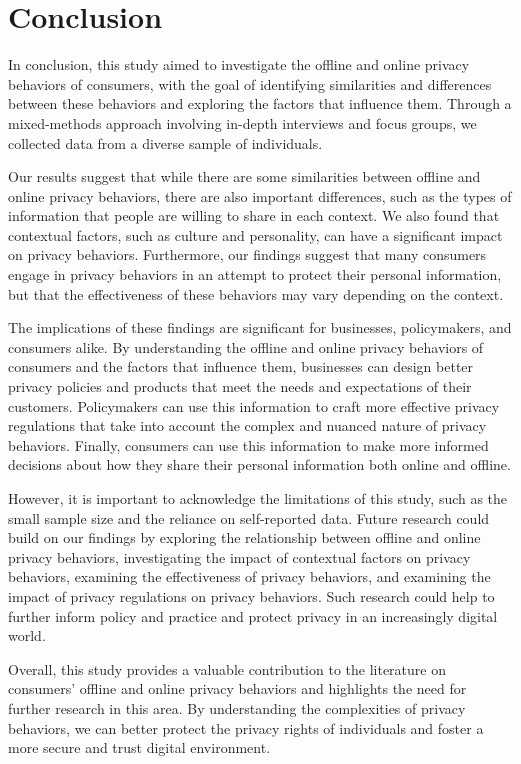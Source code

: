 \section{Conclusion}
\label{conclusion}

In conclusion, this study aimed to investigate the offline and online privacy behaviors of consumers, with the goal of identifying similarities and differences between these behaviors and exploring the factors that influence them. Through a mixed-methods approach involving in-depth interviews and focus groups, we collected data from a diverse sample of individuals.

Our results suggest that while there are some similarities between offline and online privacy behaviors, there are also important differences, such as the types of information that people are willing to share in each context. We also found that contextual factors, such as culture and personality, can have a significant impact on privacy behaviors. Furthermore, our findings suggest that many consumers engage in privacy behaviors in an attempt to protect their personal information, but that the effectiveness of these behaviors may vary depending on the context.

The implications of these findings are significant for businesses, policymakers, and consumers alike. By understanding the offline and online privacy behaviors of consumers and the factors that influence them, businesses can design better privacy policies and products that meet the needs and expectations of their customers. Policymakers can use this information to craft more effective privacy regulations that take into account the complex and nuanced nature of privacy behaviors. Finally, consumers can use this information to make more informed decisions about how they share their personal information both online and offline.

However, it is important to acknowledge the limitations of this study, such as the small sample size and the reliance on self-reported data. Future research could build on our findings by exploring the relationship between offline and online privacy behaviors, investigating the impact of contextual factors on privacy behaviors, examining the effectiveness of privacy behaviors, and examining the impact of privacy regulations on privacy behaviors. Such research could help to further inform policy and practice and protect privacy in an increasingly digital world.

Overall, this study provides a valuable contribution to the literature on consumers' offline and online privacy behaviors and highlights the need for further research in this area. By understanding the complexities of privacy behaviors, we can better protect the privacy rights of individuals and foster a more secure and trust digital environment.